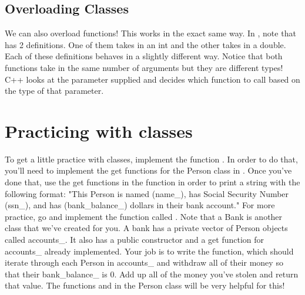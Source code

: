 \documentclass{tufte-handout}
\begin{document}
\subsection{Overloading Classes}
We can also overload functions! This works in the exact same way.
In , note that  has 2 definitions. 
One of them takes in an int and the other takes in a double.
Each of these definitions behaves in a slightly different way.
Notice that both functions take in the same number of arguments but they are different types!
C++ looks at the parameter supplied and decides which function to call based on the type of that parameter.

\section{Practicing with classes}

To get a little practice with classes, implement the function . In order to do that, you'll need to implement the get functions for the Person class in . Once you've done that, use the get functions in the  function in order to print a string with the following format: \newline
\medskip
\noindent "This Person is named (name\_), has Social Security Number (ssn\_), 
and has (bank\_balance\_) dollars in their bank account." \newline
\medskip
\noindent For more practice, go  and implement the function called . Note that a Bank is another class that we've created for you.
A bank has a private vector of Person objects called accounts\_. It also has a public constructor and a get function for accounts\_ already implemented. 
Your job is to write the  function, which should iterate through each Person in accounts\_ and withdraw all of their money so that their bank\_balance\_ is 0. Add up all of the money you've stolen and return that value. The functions  and  in the Person class will be very helpful for this!
\end{document}
